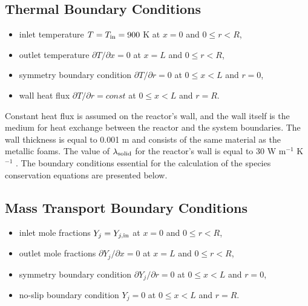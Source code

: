 \documentclass[preprint,12pt]{elsarticle}
\begin{document}
\subsection*{Thermal Boundary Conditions}
\begin{itemize}
  \item inlet temperature $T = T_{\rm{in}} = 900$ K \hspace*{\fill} \hfill at $x = 0$ and $0 \leq r < R$,
  \item outlet temperature $\partial T / \partial x = 0$ \hspace*{\fill} \hfill at $x = L$ and $0 \leq r < R$,
  \item symmetry boundary condition $\partial T / \partial r = 0$ \hspace*{\fill} \hfill at $0 \leq x < L$ and $r = 0$,
  \item wall heat flux $\partial T / \partial r =  const$ \hspace*{\fill} \hfill at $0 \leq x < L$ and $r = R$.
\end{itemize}

Constant heat flux is assumed on the reactor's wall, and the wall itself is the medium for heat exchange between the reactor and the system boundaries. The wall thickness is equal to 0.001 m and consists of the same material as the metallic foams. The value of $\lambda_{\rm{solid}}$ for the reactor's wall is equal to  30 W m$^{-1}$ K$^{-1}$ \cite{Peet2011}. The boundary conditions essential for the calculation of the species conservation equations are presented below. 

\subsection*{Mass Transport Boundary Conditions}
\begin{itemize}
  \item inlet mole fractions $Y_j = Y_{j,\rm{in}}$ \hspace*{\fill}  at $x = 0$ and $0 \leq r < R$,
  \item outlet mole fractions $\partial Y_j / \partial x = 0$ \hspace*{\fill} \hfill at $x = L$ and $0 \leq r < R$,
  \item symmetry boundary condition $\partial Y_j / \partial r = 0$ \hspace*{\fill} \hfill at $0 \leq x < L$ and $r = 0$,
  \item no-slip boundary condition $Y_j = 0$ \hspace*{\fill} \hfill at $0 \leq x < L$ and $r = R$.
\end{itemize}
\end{document}
